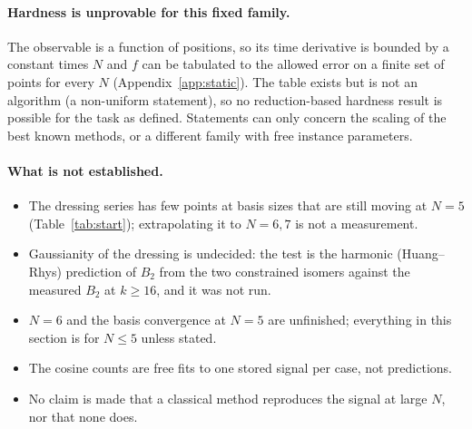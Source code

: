 \paragraph{Hardness is unprovable for this fixed family.} The observable is a function of positions, so its time derivative is bounded by a constant times $N$ and $f$ can be tabulated to the allowed error on a finite set of points for every $N$ (Appendix~\ref{app:static}). The table exists but is not an algorithm (a non-uniform statement), so no reduction-based hardness result is possible for the task as defined. Statements can only concern the scaling of the best known methods, or a different family with free instance parameters.

\paragraph{What is not established.}
\begin{itemize}[itemsep=0.15em]
\item The dressing series has few points at basis sizes that are still moving at $N=5$ (Table~\ref{tab:start}); extrapolating it to $N=6,7$ is not a measurement.
\item Gaussianity of the dressing is undecided: the test is the harmonic (Huang--Rhys) prediction of $B_2$ from the two constrained isomers against the measured $B_2$ at $k\ge16$, and it was not run.
\item $N=6$ and the basis convergence at $N=5$ are unfinished; everything in this section is for $N\le5$ unless stated.
\item The cosine counts are free fits to one stored signal per case, not predictions.
\item No claim is made that a classical method reproduces the signal at large $N$, nor that none does.
\end{itemize}

\FloatBarrier
